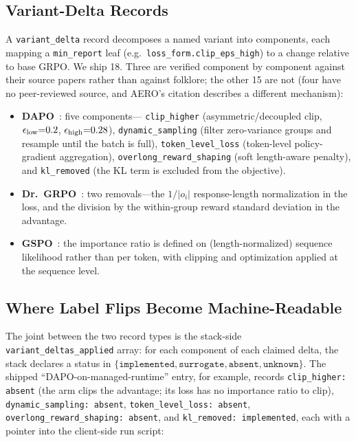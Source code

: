 \subsection{Variant-Delta Records}
\label{sec:p6-schema-delta}
A \texttt{variant_delta} record decomposes a named variant into components,
each mapping a \texttt{min_report} leaf (e.g.\
\texttt{loss_form.clip_eps_high}) to a change relative to base GRPO. We ship
18. Three are verified component by component against their source papers
rather than against folklore; the other 15 are not (four have no
peer-reviewed source, and AERO's citation describes a different mechanism):

\begin{itemize}[leftmargin=1.5em, itemsep=0.15em]
  \item \textbf{DAPO}~\citep{yu2025dapo}: five components---%
        \texttt{clip_higher} (asymmetric/decoupled clip,
        $\epsilon_{\text{low}}{=}0.2$, $\epsilon_{\text{high}}{=}0.28$),
        \texttt{dynamic_sampling} (filter zero-variance groups and resample
        until the batch is full), \texttt{token_level_loss} (token-level
        policy-gradient aggregation), \texttt{overlong_reward_shaping} (soft
        length-aware penalty), and \texttt{kl_removed} (the KL term is
        excluded from the objective).
  \item \textbf{Dr.~GRPO}~\citep{tong2025drgrpo}: two removals---the
        $1/|o_i|$ response-length normalization in the loss, and the division
        by the within-group reward standard deviation in the advantage.
  \item \textbf{GSPO}~\citep{qwen2025gspo}: the importance ratio is defined on
        (length-normalized) sequence likelihood rather than per token, with
        clipping and optimization applied at the sequence level.
\end{itemize}

\subsection{Where Label Flips Become Machine-Readable}
\label{sec:p6-schema-status}
The joint between the two record types is the stack-side
\texttt{variant_deltas_applied} array: for each component of each claimed
delta, the stack declares a status in
$\{\texttt{implemented}, \texttt{surrogate}, \texttt{absent},
\texttt{unknown}\}$. The shipped ``DAPO-on-managed-runtime'' entry, for
example, records \texttt{clip_higher: absent} (the arm clips the advantage;
its loss has no importance ratio to clip), \texttt{dynamic_sampling: absent},
\texttt{token_level_loss: absent}, \texttt{overlong_reward_shaping: absent},
and \texttt{kl_removed: implemented}, each with a pointer into the client-side
run script:

